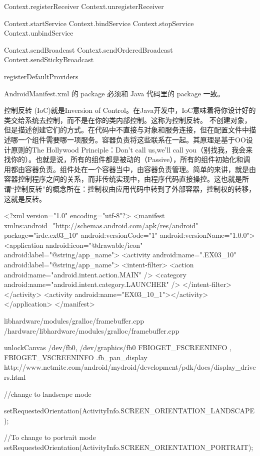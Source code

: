 \documentclass{book}
\begin{document}
\begin{CJK}{UTF8}{gbsn}
Context.registerReceiver
Context.unregisterReceiver

Context.startService
Context.bindService
Context.stopService
Context.unbindService

Context.sendBroadcast
Context.sendOrderedBroadcast
Context.sendStickyBroadcast

registerDefaultProviders


AndroidManifest.xml 的 package 必须和 Java 代码里的 package 一致。

控制反转 (IoC)就是Inversion of Control。在Java开发中，IoC意味着将你设计好的类交给系统去控制，而不是在你的类内部控制。这称为控制反转。
不创建对象，但是描述创建它们的方式。在代码中不直接与对象和服务连接，但在配置文件中描述哪一个组件需要哪一项服务。容器负责将这些联系在一起。其原理是基于OO设计原则的The Hollywood Principle：Don't call us,we'll call you（别找我，我会来找你的）。也就是说，所有的组件都是被动的（Passive），所有的组件初始化和调用都由容器负责。组件处在一个容器当中，由容器负责管理。简单的来讲，就是由容器控制程序之间的关系，而非传统实现中，由程序代码直接操控。这也就是所谓“控制反转”的概念所在：控制权由应用代码中转到了外部容器，控制权的转移，这就是反转。



<?xml version="1.0" encoding="utf-8"?>
  <manifest xmlns:android="http://schemas.android.com/apk/res/android"
      package="irdc.ex03_10"
      android:versionCode="1"
      android:versionName="1.0.0">
    <application android:icon="@drawable/icon" android:label="@string/app_name">
      <activity android:name=".EX03_10"
                android:label="@string/app_name">
        <intent-filter>
          <action android:name="android.intent.action.MAIN" />
          <category android:name="android.intent.category.LAUNCHER" />
        </intent-filter>
      </activity>
      <activity android:name="EX03_10_1"></activity>
    </application>
  </manifest> 


libhardware/modules/gralloc/framebuffer.cpp
/hardware/libhardware/modules/gralloc/framebuffer.cpp

unlockCanvas
/dev/fb0, /dev/graphics/fb0
FBIOGET_FSCREENINFO , FBIOGET_VSCREENINFO
.fb_pan_display
http://www.netmite.com/android/mydroid/development/pdk/docs/display_drivers.html

  //change to landscape mode
 
setRequestedOrientation(ActivityInfo.SCREEN_ORIENTATION_LANDSCAPE);

//To change to portrait mode
setRequestedOrientation(ActivityInfo.SCREEN_ORIENTATION_PORTRAIT);


\end{CJK}
\end{document}
